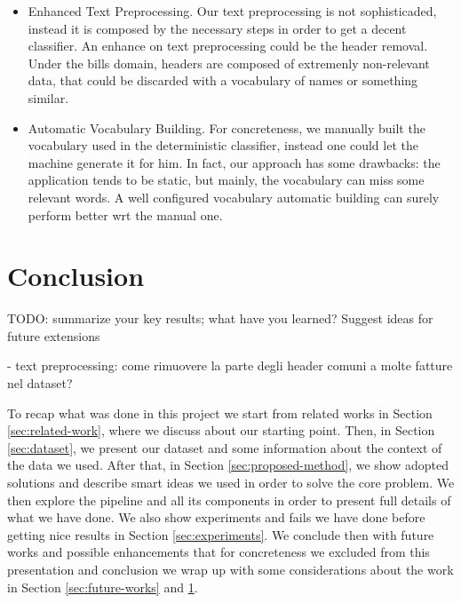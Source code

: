 \documentclass[10pt,twocolumn,letterpaper]{article}
\begin{document}
\begin{itemize}
  \item Enhanced Text Preprocessing. Our text preprocessing is not
    sophisticaded, instead it is composed by the necessary steps in
    order to get a decent classifier. An enhance on text preprocessing
    could be the header removal. Under the bills domain, headers are
    composed of extremenly non-relevant data, that could be discarded
    with a vocabulary of names or something similar.
  \item Automatic Vocabulary Building. For concreteness, we manually
    built the vocabulary used in the deterministic classifier, instead
    one could let the machine generate it for him. In fact, our
    approach has some drawbacks: the application tends to be static,
    but mainly, the vocabulary can miss some relevant words. A well
    configured vocabulary automatic building can surely perform better
    wrt the manual one. 
\end{itemize}

\section{Conclusion}
\label{sec:conclusion}

TODO: summarize your key results; what have you
learned? Suggest ideas for future extensions

- text preprocessing: come rimuovere la parte degli header comuni a molte fatture nel dataset?

To recap what was done in this project we start from related works in Section
\ref{sec:related-work}, where we discuss about our starting
point. Then, in Section \ref{sec:dataset}, we present our dataset and
some information about the context of the data we used. After that, in
Section \ref{sec:proposed-method}, we show adopted solutions and
describe smart ideas we used in order to solve the core problem. We
then explore the pipeline and all its components in order to present
full details of what we have done. We also show experiments and fails
we have done before getting nice results in Section
\ref{sec:experiments}. We conclude then with future works and possible
enhancements that for concreteness we excluded from this presentation
and conclusion we wrap up with some considerations about the work in
Section \ref{sec:future-works} and \ref{sec:conclusion}.

{\small


}
\end{document}
